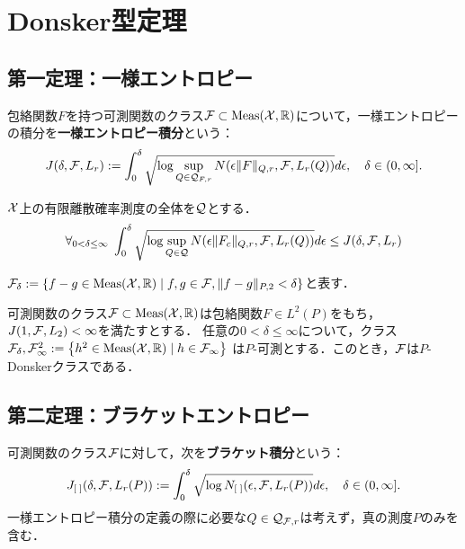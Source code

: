 \documentclass[uplatex,dvipdfmx]{jsreport}
\begin{document}
\section{Donsker型定理}

\begin{tcolorbox}[colframe=ForestGreen, colback=ForestGreen!10!white,breakable,colbacktitle=ForestGreen!40!white,coltitle=black,fonttitle=\bfseries\sffamily,
title=11/8/2021]
    
\end{tcolorbox}

\subsection{第一定理：一様エントロピー}

\begin{definition}
    包絡関数$F$を持つ可測関数のクラス$\mathcal{F}\subset\mathrm{Meas}(\mathcal{X},\mathbb{R})$について，一様エントロピーの積分を\textbf{一様エントロピー積分}という：
    \[J(\delta,\mathcal{F},L_r):=\int^\delta_0\sqrt{\log\sup_{Q\in\mathcal{Q}_{F,r}}N(\epsilon\|F\|_{Q,r},\mathcal{F},L_r(Q))}d\epsilon,\quad\delta\in(0,\infty].\]
\end{definition}

\begin{lemma}
    $\mathcal{X}$上の有限離散確率測度の全体を$\mathcal{Q}$とする．
    \[\forall_{0<\delta\le\infty}\;\int^\delta_0\sqrt{\log\sup_{Q\in\mathcal{Q}}N(\epsilon\|F_c\|_{Q,r},\mathcal{F},L_r(Q))}d\epsilon\le J(\delta,\mathcal{F},L_r)\]
\end{lemma}

\begin{notation}
    $\mathcal{F}_\delta:=\left\{f-g\in\mathrm{Meas}(\mathcal{X},\mathbb{R})\mid f,g\in\mathcal{F},\|f-g\|_{P,2}<\delta\right\}$と表す．
\end{notation}

\begin{theorem}\label{thm-Donsker-1}
    可測関数のクラス$\mathcal{F}\subset\mathrm{Meas}(\mathcal{X},\mathbb{R})$は包絡関数$F\in L^2(P)$をもち，$J(1,\mathcal{F},L_2)<\infty$を満たすとする．
    任意の$0<\delta\le\infty$について，クラス$\mathcal{F}_\delta,\mathcal{F}^2_\infty:=\left\{h^2\in\mathrm{Meas}(\mathcal{X},\mathbb{R})\mid h\in\mathcal{F}_\infty\right\}$
    は$P$-可測とする．このとき，$\mathcal{F}$は$P$-Donskerクラスである．
\end{theorem}

\subsection{第二定理：ブラケットエントロピー}

\begin{definition}
    可測関数のクラス$\mathcal{F}$に対して，次を\textbf{ブラケット積分}という：
    \[J_{[\;]}(\delta,\mathcal{F},L_r(P)):=\int^\delta_0\sqrt{\log N_{[\;]}(\epsilon,\mathcal{F},L_r(P))}d\epsilon,\quad\delta\in(0,\infty].\]
    一様エントロピー積分の定義の際に必要な$Q\in\mathcal{Q}_{\mathcal{F},r}$は考えず，真の測度$P$のみを含む．
\end{definition}
\end{document}
